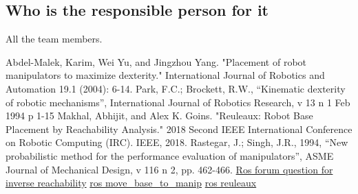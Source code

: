 \documentclass[12pt]{article}
\begin{document}
\subsection{Who is the responsible person for it}
All the team members.
\begin{thebibliography}{1}

Abdel-Malek, Karim, Wei Yu, and Jingzhou Yang. "Placement of robot manipulators to maximize dexterity." International Journal of Robotics and Automation 19.1 (2004): 6-14.
Park, F.C.; Brockett, R.W., “Kinematic dexterity of robotic mechanisms”, International
Journal of Robotics Research, v 13 n 1 Feb 1994 p 1-15
Makhal, Abhijit, and Alex K. Goins. "Reuleaux: Robot Base Placement by Reachability Analysis." 2018 Second IEEE International Conference on Robotic Computing (IRC). IEEE, 2018.
Rastegar, J.; Singh, J.R., 1994, “New probabilistic method for the performance evaluation
of manipulators”, ASME Journal of Mechanical Design, v 116 n 2, pp. 462-466.
\href{https://answers.ros.org/question/261304/what-packages-apart-from-reuleaux-can-be-used-for-optimal-base-positioning-of-a-robot-for-mobile-manipulation/}{Ros forum question for inverse reachability} 
\href{http://wiki.ros.org/move_base_to_manip}{ros move\_base\_to\_manip}
\href{http://wiki.ros.org/reuleaux}{ros reuleaux}
\end{thebibliography}
\end{document}
